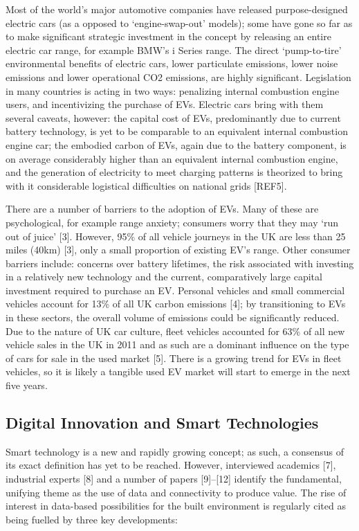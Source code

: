 \documentclass[journal]{IEEEtran}
\begin{document}
Most of the world's major automotive companies have released
purpose-designed electric cars (as a opposed to `engine-swap-out'
models); some have gone so far as to make significant strategic
investment in the concept by releasing an entire electric car range,
for example BMW's i Series range. The direct `pump-to-tire' environmental
benefits of electric cars, lower particulate emissions, lower noise
emissions and lower operational CO2 emissions, are highly
significant. Legislation in many countries is acting in two ways:
penalizing internal combustion engine users, and incentivizing the
purchase of EVs. Electric cars bring with them several caveats,
however: the capital cost of EVs, predominantly due to current battery
technology, is yet to be comparable to an equivalent internal
combustion engine car; the embodied carbon of EVs, again due to the
battery component, is on average considerably higher than an
equivalent internal combustion engine, and the generation of
electricity to meet charging patterns is theorized to bring with it
considerable logistical difficulties on national grids [REF5].

There are a number of barriers to the adoption of EVs. Many of these
are psychological, for example range anxiety; consumers worry that
they may `run out of juice' [3]. However, 95\% of all vehicle journeys
in the UK are less than 25 miles (40km) [3], only a small proportion
of existing EV's range. Other consumer barriers include: concerns over
battery lifetimes, the risk associated with investing in a relatively
new technology and the current, comparatively large capital investment
required to purchase an EV.  Personal vehicles and small commercial
vehicles account for 13\% of all UK carbon emissions [4]; by
transitioning to EVs in these sectors, the overall volume of emissions
could be significantly reduced. Due to the nature of UK car culture,
fleet vehicles accounted for 63\% of all new vehicle sales in the UK
in 2011 and as such are a dominant influence on the type of cars for
sale in the used market [5]. There is a growing trend for EVs in fleet
vehicles, so it is likely a tangible used EV market will start to
emerge in the next five years.


\subsection{Digital Innovation and Smart Technologies}

Smart technology is a new and rapidly growing concept; as such, a
consensus of its exact definition has yet to be reached. However,
interviewed academics [7], industrial experts [8] and a number of
papers [9]–[12] identify the fundamental, unifying theme as the use of
data and connectivity to produce value. The rise of interest in
data-based possibilities for the built environment is regularly cited
as being fuelled by three key developments:
\end{document}

